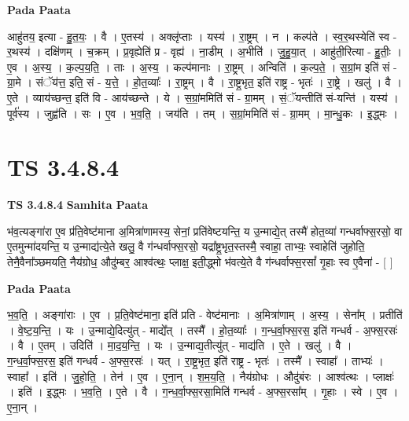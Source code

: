 \documentclass[17pt]{extarticle}
\begin{document}
\textbf{Pada Paata} \newline

आहु॑तय॒ इत्या - हु॒त॒यः॒ । वै । ए॒तस्य॑ । अक्लृ॑प्ताः । यस्य॑ । रा॒ष्ट्रम् । न । कल्प॑ते । स्व॒र॒थस्येति॑ स्व - र॒थस्य॑ । दक्षि॑णम् । च॒क्रम् । प्र॒वृह्येति॑ प्र - वृह्य॑ । ना॒डीम् । अ॒भीति॑ । जु॒हु॒या॒त् । आहु॑ती॒रित्या - हु॒तीः॒ । ए॒व । अ॒स्य॒ । क॒ल्प॒य॒ति॒ । ताः । अ॒स्य॒ । कल्प॑मानाः । रा॒ष्ट्रम् । अन्विति॑ । क॒ल्प॒ते॒ । स॒ग्रां॒म इति॑ सं - ग्रा॒मे । संॅय॑त्त॒ इति॒ सं - य॒त्ते॒ । हो॒त॒व्याः᳚ । रा॒ष्ट्रम् । वै । रा॒ष्ट्र॒भृत॒ इति॑ राष्ट्र - भृतः॑ । रा॒ष्ट्रे । खलु॑ । वै । ए॒ते । व्याय॑च्छन्त॒ इति॑ वि - आय॑च्छन्ते । ये । स॒ग्रां॒ममिति॑ सं - ग्रा॒मम् । सं॒ॅयन्तीति॑ सं-यन्ति॑ । यस्य॑ । पूर्व॑स्य । जुह्व॑ति । सः । ए॒व । भ॒व॒ति॒ । जय॑ति । तम् । स॒ग्रां॒ममिति॑ सं - ग्रा॒मम् । मा॒न्धु॒कः । इ॒द्ध्मः ।  \newline




\section*{ TS 3.4.8.4 }

\textbf{TS 3.4.8.4 } \newline
\textbf{Samhita Paata} \newline

भ॑व॒त्यङ्गा॑रा ए॒व प्र॑ति॒वेष्ट॑माना अ॒मित्रा॑णामस्य॒ सेनां॒ प्रति॑वेष्टयन्ति॒ य उ॒न्माद्ये॒त् तस्मै॑ होत॒व्या॑ गन्धर्वाफ्स॒रसो॒ वा ए॒तमुन्मा॑दयन्ति॒ य उ॒न्माद्य॑त्ये॒ते खलु॒ वै ग॑न्धर्वाफ्स॒रसो॒ यद्रा᳚ष्ट्र॒भृत॒स्तस्मै॒ स्वाहा॒ ताभ्यः॒ स्वाहेति॑ जुहोति॒ तेनै॒वैना᳚ञ्छमयति॒ नैय॑ग्रोध॒ औदु॑म्बर॒ आश्व॑त्थः॒ प्लाक्ष॒ इती॒द्ध्मो भ॑वत्ये॒ते वै ग॑न्धर्वाफ्स॒रसां᳚ गृ॒हाः स्व ए॒वैना॑ - [  ] \newline

\textbf{Pada Paata} \newline

भ॒व॒ति॒ । अङ्गा॑राः । ए॒व । प्र॒ति॒वेष्ट॑माना॒ इति॑ प्रति - वेष्ट॑मानाः । अ॒मित्रा॑णाम् । अ॒स्य॒ । सेना᳚म् । प्रतीति॑ । वे॒ष्ट॒य॒न्ति॒ । यः । उ॒न्माद्ये॒दित्यु॑त् - माद्ये᳚त् । तस्मै᳚ । हो॒त॒व्याः᳚ । ग॒न्ध॒र्वा॒फ्स॒रस॒ इति॑ गन्धर्व - अ॒फ्स॒रसः॑ । वै । ए॒तम् । उदिति॑ । मा॒द॒य॒न्ति॒ । यः । उ॒न्माद्य॒तीत्यु॑त् - माद्य॑ति । ए॒ते । खलु॑ । वै । ग॒न्ध॒र्वा॒फ्स॒रस॒ इति॑ गन्धर्व - अ॒फ्स॒रसः॑ । यत् । रा॒ष्ट्र॒भृत॒ इति॑ राष्ट्र - भृतः॑ । तस्मै᳚ । स्वाहा᳚ । ताभ्यः॑ । स्वाहा᳚ । इति॑ । जु॒हो॒ति॒ । तेन॑ । ए॒व । ए॒ना॒न् । श॒म॒य॒ति॒ । नैय॑ग्रोधः । औदु॑बंरः । आश्व॑त्थः । प्लाक्षः॑ । इति॑ । इ॒द्ध्मः । भ॒व॒ति॒ । ए॒ते । वै । ग॒न्ध॒र्वा॒फ्स॒रसा॒मिति॑ गन्धर्व - अ॒फ्स॒रसा᳚म् । गृ॒हाः । स्वे । ए॒व । ए॒ना॒न् ।  \newline
\end{document}
